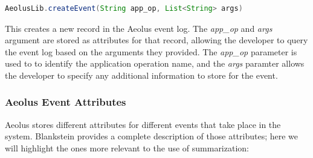 \begin{lstlisting}[language=Java, label=app-logging]
AeolusLib.createEvent(String app_op, List<String> args)
\end{lstlisting}

\noindent
This creates a new record in the Aeolus event log. The \emph{app\_op} and \emph{args} argument are stored as attributes for that record, allowing the developer to query the event log based on the arguments they provided. The \emph{app\_op} parameter is used to to identify the application operation name, and the \emph{args} paramter allows the developer to specify any additional information to store for the event.

\subsubsection{Aeolus Event Attributes}
\label{sec:aeolus-event-attributes}
Aeolus stores different attributes for different events that take place in the system. Blankstein \cite{blanks} provides a complete description of those attributes; here we will highlight the ones more relevant to the use of summarization:


